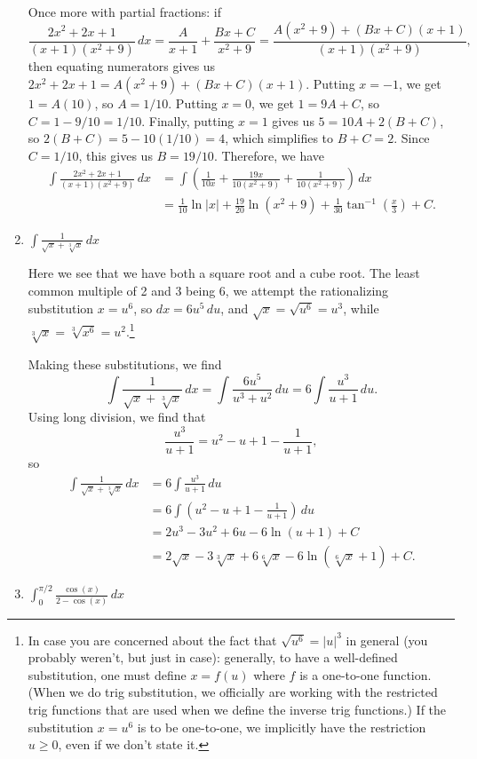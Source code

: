 \documentclass[12pt]{article}
\newcommand{\di}{\displaystyle}
\newcommand{\abs}[1]{\lvert #1\rvert}
\begin{document}
\begin{enumerate}
Once more with partial fractions: if
\[
 \frac{2x^2+2x+1}{(x+1)(x^2+9)}\,dx = \frac{A}{x+1}+\frac{Bx+C}{x^2+9} = \frac{A(x^2+9)+(Bx+C)(x+1)}{(x+1)(x^2+9)},
\]
then equating numerators gives us $2x^2+2x+1 = A(x^2+9)+(Bx+C)(x+1)$. Putting $x=-1$, we get $1=A(10)$, so $A=1/10$. Putting $x=0$, we get $1=9A+C$, so $C=1-9/10=1/10$. Finally, putting $x=1$ gives us $5=10A+2(B+C)$, so $2(B+C)=5-10(1/10)=4$, which simplifies to $B+C=2$. Since $C=1/10$, this gives us $B=19/10$. Therefore, we have
\begin{align*}
 \int\frac{2x^2+2x+1}{(x+1)(x^2+9)}\,dx &= \int\left(\frac{1}{10x}+\frac{19x}{10(x^2+9)}+\frac{1}{10(x^2+9)}\right)\,dx\\
& = \frac{1}{10}\ln\abs{x}+\frac{19}{20}\ln(x^2+9)+\frac{1}{30}\tan^{-1}\left(\frac{x}{3}\right)+C.
\end{align*}
 \item $\di \int \frac{1}{\sqrt{x}+\sqrt[3]{x}}\,dx$
 
 \medskip
 
 Here we see that we have both a square root and a cube root. The least common multiple of 2 and 3 being 6, we attempt the rationalizing substitution $x=u^6$, so $dx=6u^5\,du$, and $\sqrt{x}=\sqrt{u^6}=u^3$, while $\sqrt[3]{x}=\sqrt[3]{x^6}=u^2$.\footnote{In case you are concerned about the fact that $\sqrt{u^6}=\abs{u}^3$ in general (you probably weren't, but just in case): generally, to have a well-defined substitution, one must define $x=f(u)$ where $f$ is a one-to-one function. (When we do trig substitution, we officially are working with the restricted trig functions that are used when we define the inverse trig functions.) If the substitution $x=u^6$ is to be one-to-one, we implicitly have the restriction $u\geq 0$, even if we don't state it.}
 
 Making these substitutions, we find
 \[
 \int \frac{1}{\sqrt{x}+\sqrt[3]{x}}\,dx = \int\frac{6u^5}{u^3+u^2}\,du = 6\int\frac{u^3}{u+1}\,du.
 \]
 Using long division, we find that
 \[
 \frac{u^3}{u+1} = u^2-u+1-\frac{1}{u+1},
 \]
 so
 \begin{align*}
 \int \frac{1}{\sqrt{x}+\sqrt[3]{x}}\,dx & = 6\int\frac{u^3}{u+1}\,du\\
 & = 6\int\left(u^2-u+1-\frac{1}{u+1}\right)\,du\\
 & = 2u^3-3u^2+6u-6\ln(u+1)+C\\
 & = 2\sqrt{x}-3\sqrt[3]{x}+6\sqrt[6]{x}-6\ln(\sqrt[6]{x}+1)+C.
 \end{align*}
 \item $\di \int_0^{\pi/2}\frac{\cos(x)}{2-\cos(x)}\,dx$
 

\end{enumerate}
\end{document}
